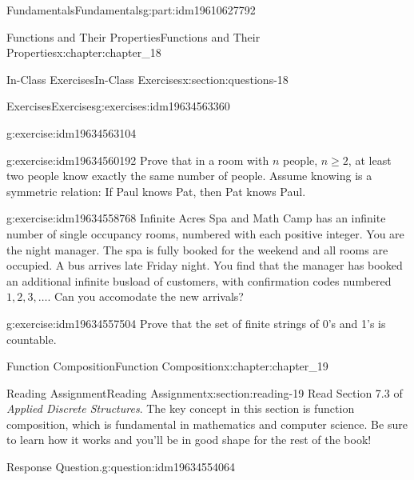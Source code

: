 \documentclass[oneside,10pt,]{book}
\numberwithin{equation}{section}
\begin{document}
\begin{partptx}{Fundamentals}{}{Fundamentals}{}{}{g:part:idm19610627792}
\begin{chapterptx}{Functions and Their Properties}{}{Functions and Their Properties}{}{}{x:chapter:chapter_18}
\begin{sectionptx}{In-Class Exercises}{}{In-Class Exercises}{}{}{x:section:questions-18}
\begin{exercises-subsection-numberless}{Exercises}{}{Exercises}{}{}{g:exercises:idm19634563360}
\begin{exercisegroup}
\begin{divisionexerciseeg}{1}{}{}{g:exercise:idm19634563104}
\begin{enumerate}[label=(\alph*)]
\end{enumerate}
%
\end{divisionexerciseeg}%
\begin{divisionexerciseeg}{2}{}{}{g:exercise:idm19634560192}%
Prove that in a room with \(n\) people, \(n \geq 2\), at least two people know exactly the same number of people. Assume knowing is a symmetric relation: If Paul knows Pat, then Pat knows Paul.%
\end{divisionexerciseeg}%
\begin{divisionexerciseeg}{3}{}{}{g:exercise:idm19634558768}%
Infinite Acres Spa and Math Camp has an infinite number of single occupancy rooms, numbered with each positive integer.  You are the night manager.  The spa is fully booked for the weekend and all rooms are occupied. A bus arrives late Friday night.  You find that the manager has booked an additional infinite busload of customers, with confirmation codes numbered \(1, 2, 3, \dots\).   Can you accomodate the new arrivals?%
\end{divisionexerciseeg}%
\begin{divisionexerciseeg}{4}{}{}{g:exercise:idm19634557504}%
Prove that the set of finite strings of 0's and 1's is countable.%
\end{divisionexerciseeg}%
\end{exercisegroup}
\par\medskip\noindent
\end{exercises-subsection-numberless}
\end{sectionptx}
\end{chapterptx}
%
\typeout{************************************************}
\typeout{************************************************}
%
\begin{chapterptx}{Function Composition}{}{Function Composition}{}{}{x:chapter:chapter_19}
%
%
%
\typeout{************************************************}
\typeout{************************************************}
%
\begin{sectionptx}{Reading Assignment}{}{Reading Assignment}{}{}{x:section:reading-19}
Read Section 7.3 of \emph{Applied Discrete Structures}.  The key concept in this section is function composition, which is fundamental in mathematics and computer science. Be sure to learn how it works and you'll be in good shape for the rest of the book!%
\begin{question}{Response Question.}{g:question:idm19634554064}%

\end{question}
\end{sectionptx}
\end{chapterptx}
\end{partptx}
\end{document}
